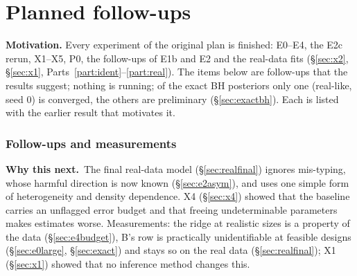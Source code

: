 \documentclass[10pt,a4paper]{article}
\newcommand{\blk}[1]{\par\needspace{5\baselineskip}\smallskip{\sffamily\bfseries\color{inkgray}#1}\par}
\newcommand{\Q}{\blk{Question}}
\newcommand{\Why}[1]{\begin{whybox}{\sffamily\bfseries\color{cblue}Why this next.}\ #1\end{whybox}}
\renewcommand{\blk}[1]{\par\Needspace*{5\baselineskip}\smallskip{\sffamily\bfseries\color{inkgray}#1}\par}
\newcommand{\expsec}[2]{\Needspace*{18\baselineskip}\section{#1}\label{#2}}
\newcommand{\partintro}[1]{\begin{keybox}#1\end{keybox}}
\newcommand{\sref}[1]{\S\ref{#1}}
\begin{document}
\clearpage
\part{Planned follow-ups}\label{part:pending}
\partintro{\textbf{Motivation.} Every experiment of the original plan is finished: E0--E4, the E2c rerun, X1--X5, P0, the follow-ups of E1b and E2 and the real-data fits (\sref{sec:x2}, \sref{sec:x1}, Parts~\ref{part:ident}--\ref{part:real}). The items below are follow-ups that the results suggest; nothing is running; of the exact BH posteriors only one (real-like, seed 0) is converged, the others are preliminary (\sref{sec:exactbh}). Each is listed with the earlier result that motivates it.}

\expsec{Follow-ups and measurements}{sec:p-other}
\Why{The final real-data model (\sref{sec:realfinal}) ignores mis-typing, whose harmful direction is now known (\sref{sec:e2asym}), and uses one simple form of heterogeneity and density dependence. X4 (\sref{sec:x4}) showed that the baseline carries an unflagged error budget and that freeing undeterminable parameters makes estimates worse. Measurements: the ridge at realistic sizes is a property of the data (\sref{sec:e4budget}), B's row is practically unidentifiable at feasible designs (\sref{sec:e0large}, \sref{sec:exact}) and stays so on the real data (\sref{sec:realfinal}); X1 (\sref{sec:x1}) showed that no inference method changes this.}
\Q
\end{document}
